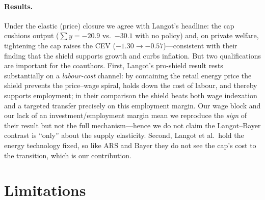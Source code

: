 \documentclass[11pt,a4paper]{article}
\begin{document}
\paragraph{Results.} Under the elastic (price) closure we agree with Langot's
headline: the cap cushions output ($\sum y = -20.9$ vs.\ $-30.1$ with no
policy) and, on private welfare, tightening the cap raises the CEV
($-1.30\to-0.57$)---consistent with their finding that the shield supports
growth and curbs inflation. But two qualifications are important for the
coauthors. First, Langot's pro-shield result rests substantially on a
\emph{labour-cost} channel: by containing the retail energy price the shield
prevents the price--wage spiral, holds down the cost of labour, and thereby
supports employment; in their comparison the shield beats both wage indexation
and a targeted transfer precisely on this employment margin. Our wage block and
our lack of an investment/employment margin mean we reproduce the \emph{sign}
of their result but not the full mechanism---hence we do not claim the
Langot--Bayer contrast is ``only'' about the supply elasticity. Second, Langot
et al.\ hold the energy technology fixed, so like ARS and Bayer they do not see
the cap's cost to the transition, which is our contribution.

\section{Limitations}
\label{sec:limits}
\end{document}
